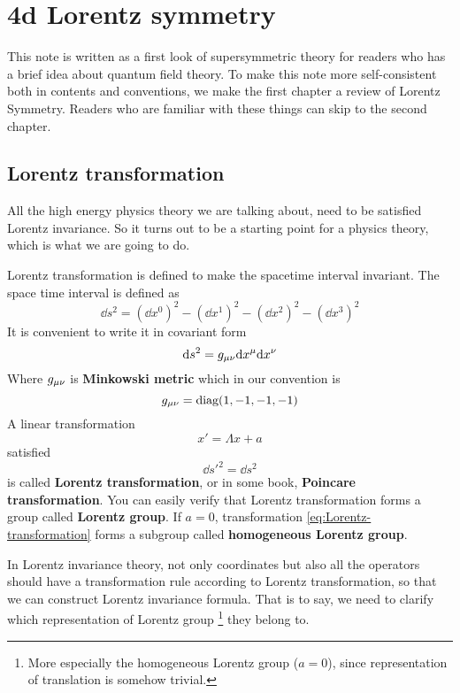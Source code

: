 \chapter{4d Lorentz symmetry}

This note is written as a first look of supersymmetric theory for readers who has a brief idea about quantum field theory. To make this note more self-consistent both in contents and conventions, we make the first chapter a review of Lorentz Symmetry. Readers who are familiar with these things can skip to the second chapter.

\section{Lorentz transformation}

All the high energy physics theory we are talking about, need to be satisfied Lorentz invariance. So it turns out to be a starting point for a physics theory, which is what we are going to do.

Lorentz transformation is defined to make the spacetime interval invariant. The space time interval is defined as
\begin{equation}
  \dd s^2 = (\dd x^0)^2-(\dd x^1)^2-(\dd x^2)^2-(\dd x^3)^2
\end{equation}
It is convenient to write it in covariant form
\begin{equation}
  \dd s^2 =g_{\mu\nu}\dd x^{\mu}\dd x^{\nu}
\end{equation}
Where $g_{\mu\nu}$ is \textbf{Minkowski metric} which in our convention is
\begin{equation}
  g_{\mu\nu} =\text{diag}(1,-1,-1,-1)
\end{equation}
A linear transformation
\begin{equation} \label{eq:Lorentz-transformation}
  x' = \Lambda x + a
\end{equation}
satisfied
\begin{equation} \label{eq:Lorentz-invariance}
  \dd s'^2=\dd s^2
\end{equation}
is called \textbf{Lorentz transformation}, or in some book, \textbf{Poincare transformation}. You can easily verify that Lorentz transformation forms a group called \textbf{Lorentz group}. If $a = 0$, transformation \eqref{eq:Lorentz-transformation} forms a subgroup called \textbf{homogeneous Lorentz group}.

In Lorentz invariance theory, not only coordinates but also all the operators should have a transformation rule according to Lorentz transformation, so that we can construct Lorentz invariance formula. That is to say, we need to clarify which representation of Lorentz group \footnote{More especially the homogeneous Lorentz group ($a=0$), since representation of translation is somehow trivial.} they belong to.

